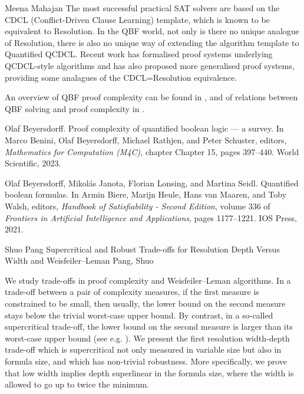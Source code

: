 \documentclass[report]{owrart}
\begin{document}
\begin{report}
\begin{talk}{Meena Mahajan}
The most successful practical SAT solvers are based on the CDCL
(Conflict-Driven Clause Learning) template, which is known to be
equivalent to Resolution. In the QBF world, not only is there no
unique analogue of Resolution, there is also no unique way of
extending the algorithm template to Quantified QCDCL. Recent work has
formalised proof systems underlying QCDCL-style algorithms and has
also proposed more generalised proof systems, providing some analagues
of the CDCL=Resolution equivalence.

An overview of QBF proof complexity can be found in
\cite{Beyersdorff-M4C23}, and of relations between QBF solving and
proof complexity in \cite{BJLS-HandbookSAT21}.

  \begin{thebibliography}{99}

Olaf Beyersdorff.
\newblock Proof complexity of quantified boolean logic — a survey.
\newblock In Marco Benini, Olaf Beyersdorff, Michael Rathjen, and Peter
  Schuster, editors, {\em Mathematics for Computation (M4C)}, chapter Chapter
  15, pages 397--440. World Scientific, 2023.

Olaf Beyersdorff, Mikol{\'{a}}s Janota, Florian Lonsing, and Martina Seidl.
\newblock Quantified boolean formulas.
\newblock In Armin Biere, Marijn Heule, Hans van Maaren, and Toby Walsh,
  editors, {\em Handbook of Satisfiability - Second Edition}, volume 336 of
  {\em Frontiers in Artificial Intelligence and Applications}, pages
  1177--1221. {IOS} Press, 2021.

  \end{thebibliography}
\end{talk}


\begin{talk}{Shuo Pang}
  {Supercritical and Robust Trade-offs for Resolution Depth Versus Width and Weisfeiler--Leman}
  {Pang, Shuo}
  
  \noindent
  We study trade-offs in proof complexity and Weisfeiler--Leman algorithms. 
  In a trade-off between a pair of complexity measures, 
  if the first measure is constrained to be small, then usually, the lower bound on the second measure stays below the trivial worst-case upper bound. 
  By contrast, in a so-called supercritical trade-off, the lower bound on the second measure is larger than its worst-case upper bound (see e.g. \cite{BBI16TimeSpace,BNT13SomeTradeoffs,Razborov16NewKind,BN20Supercritical,fleming2022extremely,buss2024simple}). 
  We present the first resolution width-depth trade-off which is supercritical not only measured in variable size but also in formula size, and which has non-trivial robustness. More specifically, we prove that low width implies depth superlinear in the formula size, where the width is allowed to go up to twice the minimum.
  

\end{talk}
\end{report}
\end{document}
